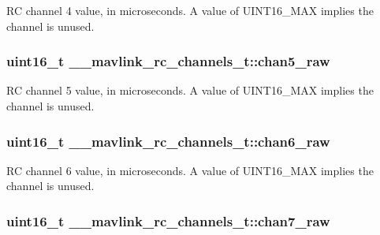 R\+C channel 4 value, in microseconds. A value of U\+I\+N\+T16\+\_\+\+M\+A\+X implies the channel is unused. 

\hypertarget{struct____mavlink__rc__channels__t_adaab87a7e10694d4a621f4a7856fe407}{
\subsubsection[{chan5\+\_\+raw}]{\setlength{\rightskip}{0pt plus 5cm}uint16\+\_\+t \+\_\+\+\_\+mavlink\+\_\+rc\+\_\+channels\+\_\+t\+::chan5\+\_\+raw}}\label{struct____mavlink__rc__channels__t_adaab87a7e10694d4a621f4a7856fe407}


R\+C channel 5 value, in microseconds. A value of U\+I\+N\+T16\+\_\+\+M\+A\+X implies the channel is unused. 

\hypertarget{struct____mavlink__rc__channels__t_a13dc783e33d94fd8a3dabe55a011e3b9}{
\subsubsection[{chan6\+\_\+raw}]{\setlength{\rightskip}{0pt plus 5cm}uint16\+\_\+t \+\_\+\+\_\+mavlink\+\_\+rc\+\_\+channels\+\_\+t\+::chan6\+\_\+raw}}\label{struct____mavlink__rc__channels__t_a13dc783e33d94fd8a3dabe55a011e3b9}


R\+C channel 6 value, in microseconds. A value of U\+I\+N\+T16\+\_\+\+M\+A\+X implies the channel is unused. 

\hypertarget{struct____mavlink__rc__channels__t_ae3b8250180999e3730cac28cb63853b4}{
\subsubsection[{chan7\+\_\+raw}]{\setlength{\rightskip}{0pt plus 5cm}uint16\+\_\+t \+\_\+\+\_\+mavlink\+\_\+rc\+\_\+channels\+\_\+t\+::chan7\+\_\+raw}}\label{struct____mavlink__rc__channels__t_ae3b8250180999e3730cac28cb63853b4}


